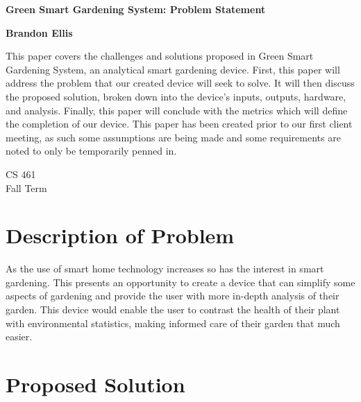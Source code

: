 \documentclass[IEEEtran,letterpaper,10pt,titlepage,fleqn,draftclsnofoot,onecolumn]{article}
\begin{document}
\begin{titlepage}
	\begin{center}
		\vspace*{1cm}
		
		\huge
		\textbf{Green Smart Gardening System: Problem Statement}
        
        \vspace{1.5cm}
        
		\large
        \textbf{Brandon Ellis}
		
		\vspace{5cm}
		
		\normalsize
		This paper covers the challenges and solutions proposed in Green Smart Gardening System, an analytical smart gardening device. First, this paper will address the problem that our created device will seek to solve. It will then discuss the proposed solution, broken down into the device’s inputs, outputs, hardware, and analysis. Finally, this paper will conclude with the metrics which will define the completion of our device. This paper has been created prior to our first client meeting, as such some assumptions are being made and some requirements are noted to only be temporarily penned in.
		
		\vfill
        
		\large
        CS 461\\
        Fall Term\\
    \end{center}
\end{titlepage}

\section{Description of Problem}

As the use of smart home technology increases so has the interest in smart gardening. This presents an opportunity to create a device that can simplify some aspects of gardening and provide the user with more in-depth analysis of their garden. This device would enable the user to contrast the health of their plant with environmental statistics, making informed care of their garden that much easier. 

\vspace{5mm}

\section{Proposed Solution}
\end{document}
